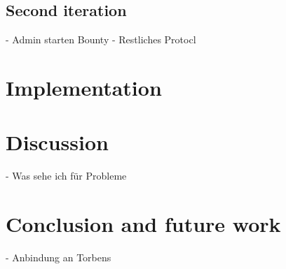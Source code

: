 \documentclass[sigconf]{acmart}
\begin{document}
\subsection{Second iteration}
- Admin starten Bounty
- Restliches Protocl

\section{Implementation}


\section{Discussion}
- Was sehe ich für Probleme

\section{Conclusion and future work}
- Anbindung an Torbens 







\appendix
\end{document}
